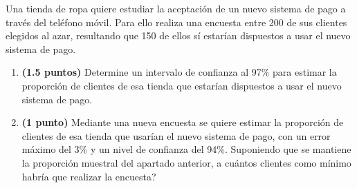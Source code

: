 
Una tienda de ropa quiere estudiar la aceptación de un nuevo sistema de
pago a través del teléfono móvil. Para ello realiza una encuesta entre 200
de sus clientes elegidos al azar, resultando que 150 de ellos sí estarían
dispuestos a usar el nuevo sistema de pago.
\begin{enumerate}[label=\alph*)]
  \item \textbf{(1.5 puntos)} Determine un intervalo de confianza al 97\%
  para estimar la proporción de clientes de esa tienda que estarían
  dispuestos a usar el nuevo sistema de pago.
  \item \textbf{(1 punto)} Mediante una nueva encuesta se quiere estimar
  la proporción de clientes de esa tienda que usarían el nuevo sistema de
  pago, con un error máximo del 3\% y un nivel de confianza del 94\%.
  Suponiendo que se mantiene la proporción muestral del apartado anterior,
  \textquestiondown{}a cuántos clientes como mínimo habría que realizar
  la encuesta?
\end{enumerate}
